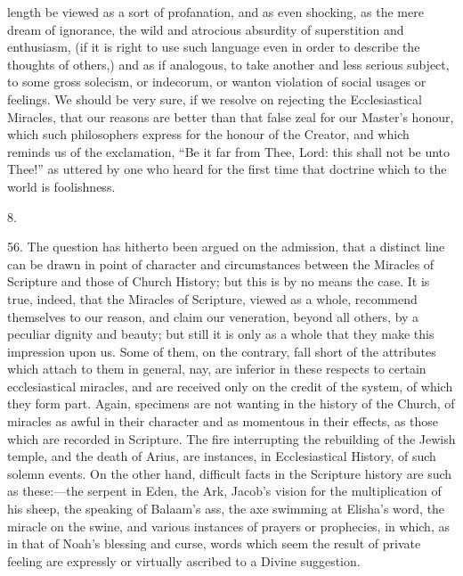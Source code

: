 length be viewed as a sort of profanation, and as even shocking, as
the mere dream of ignorance, the wild and atrocious absurdity of
superstition and enthusiasm, (if it is right to use such language even
in order to describe the thoughts of others,) and as if analogous, to
take another and less serious subject, to some gross solecism, or
indecorum, or wanton violation of social usages or feelings. We should
be very sure, if we resolve on rejecting the Ecclesiastical Miracles,
that our reasons are better than that false zeal for our Master's
honour, which such philosophers express for the honour of the Creator,
and which reminds us of the exclamation, ``Be it far from Thee, Lord:
this shall not be unto Thee!'' as uttered by one who heard for the
first time that doctrine which to the world is foolishness.

8.

56.
The question has hitherto been argued on the admission, that a
distinct line can be drawn in point of character and circumstances
between the Miracles of Scripture and those of Church History; but
this is by no means the case. It is true, indeed, that the Miracles of
Scripture, viewed as a whole, recommend themselves to our reason, and
claim our veneration, beyond all others, by a peculiar dignity and
beauty; but still it is only as a whole that they make this impression
upon us. Some of them, on the contrary, fall short of the attributes
which attach to them in general, nay, are inferior in these respects
to certain ecclesiastical miracles, and are received only on the credit of the system, of which they form part. Again, specimens are
not wanting in the history of the Church, of miracles as awful in
their character and as momentous in their effects, as those which are
recorded in Scripture. The fire interrupting the rebuilding of the
Jewish temple, and the death of Arius, are instances, in
Ecclesiastical History, of such solemn events. On the other hand,
difficult facts in the Scripture history are such as these:—the
serpent in Eden, the Ark, Jacob's vision for the multiplication of his
sheep, the speaking of Balaam's ass, the axe swimming at Elisha's
word, the miracle on the swine, and various instances of prayers or
prophecies, in which, as in that of Noah's blessing and curse, words
which seem the result of private feeling are expressly or virtually
ascribed to a Divine suggestion.

